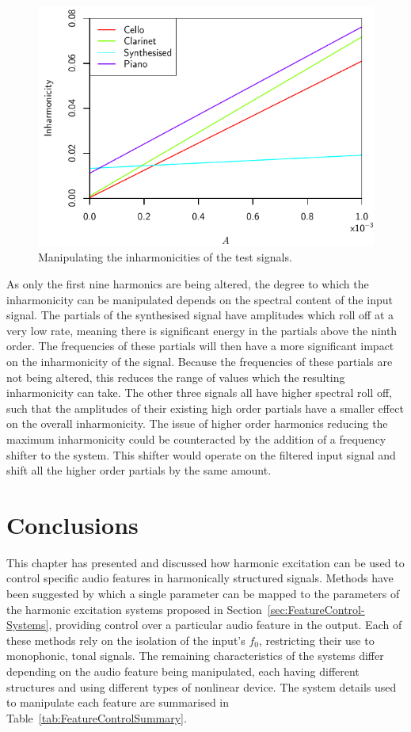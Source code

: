 		\begin{figure}[h!]
			\centering
			\includegraphics{chapter6/Images/MoveInharmonicities.pdf}
			\caption{Manipulating the inharmonicities of the test signals.}
			\label{fig:MoveInharmonicities}
		\end{figure}

		As only the first nine harmonics are being altered, the degree to which the inharmonicity can be
		manipulated depends on the spectral content of the input signal. The partials of the synthesised signal
		have amplitudes which roll off at a very low rate, meaning there is significant energy in the partials
		above the ninth order. The frequencies of these partials will then have a more significant impact on the
		inharmonicity of the signal. Because the frequencies of these partials are not being altered, this reduces
		the range of values which the resulting inharmonicity can take. The other three signals all have higher
		spectral roll off, such that the amplitudes of their existing high order partials have a smaller effect on
		the overall inharmonicity. The issue of higher order harmonics reducing the maximum inharmonicity could be
		counteracted by the addition of a frequency shifter to the system. This shifter would operate on the
		filtered input signal and shift all the higher order partials by the same amount.

\section{Conclusions}
\label{sec:FeatureControl-Conclusions}
	This chapter has presented and discussed how harmonic excitation can be used to control specific audio features in
	harmonically structured signals. Methods have been suggested by which a single parameter can be mapped to the
	parameters of the harmonic excitation systems proposed in Section~\ref{sec:FeatureControl-Systems}, providing
	control over a particular audio feature in the output. Each of these methods rely on the isolation of the input's
	$f_{0}$, restricting their use to monophonic, tonal signals. The remaining characteristics of the systems differ
	depending on the audio feature being manipulated, each having different structures and using different types of
	nonlinear device. The system details used to manipulate each feature are summarised in
	Table~\ref{tab:FeatureControlSummary}.

